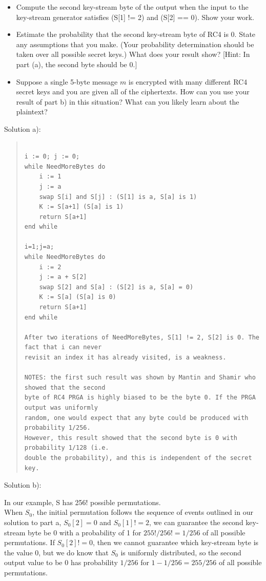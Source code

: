 \documentclass[12pt, letterpaper]{article}
\begin{document}
\begin{itemize}
\item[a)] Compute the second key-stream byte of the output when the input to the key-stream generator satisfies (S[1] != 2) and  (S[2] == 0). Show your work.

\item[b)] Estimate the probability that the second key-stream byte of RC4 is 0.  State any assumptions that you make.  (Your probability determination should be taken over all possible secret keys.)  What does your result show?
\hfill [Hint: In part (a), the second byte should be 0.]

\item[c)] Suppose a single 5-byte message $m$ is encrypted with many different RC4 secret keys and you are given all of the ciphertexts.  How can you use your result of part b) in this situation? What can you likely learn about the plaintext?
\end{itemize}
Solution a):
\begin{quote}

\begin{Verbatim}

i := 0; j := 0;
while NeedMoreBytes do
    i := 1
    j := a
    swap S[i] and S[j] : (S[1] is a, S[a] is 1)
    K := S[a+1] (S[a] is 1)
    return S[a+1]
end while

i=1;j=a;
while NeedMoreBytes do
    i := 2
    j := a + S[2] 
    swap S[2] and S[a] : (S[2] is a, S[a] = 0)
    K := S[a] (S[a] is 0)
    return S[a+1]
end while

After two iterations of NeedMoreBytes, S[1] != 2, S[2] is 0. The fact that i can never 
revisit an index it has already visited, is a weakness. 

NOTES: the first such result was shown by Mantin and Shamir who showed that the second
byte of RC4 PRGA is highly biased to be the byte 0. If the PRGA output was uniformly 
random, one would expect that any byte could be produced with probability 1/256. 
However, this result showed that the second byte is 0 with probability 1/128 (i.e. 
double the probability), and this is independent of the secret key.

\end{Verbatim}
\end{quote}
\clearpage
Solution b):

In our example, S has 256! possible permutations.\\
When $S_0$, the initial permutation follows the sequence of events outlined in our solution to part a, $S_0[2] = 0 $ and $S_0[1] != 2$, we can guarantee the second key-stream byte be 0 with a probability of 1 for $255!/256! = 1/256$ of all possible permutations. If $S_0[2] != 0 $, then we cannot guarantee which key-stream byte is the value $0$, but we do know that $S_0$ is uniformly distributed, so the second output value to be 0 has probability $1/256$ for $1-1/256 = 255/256$ of all possible permutations.
\end{document}
